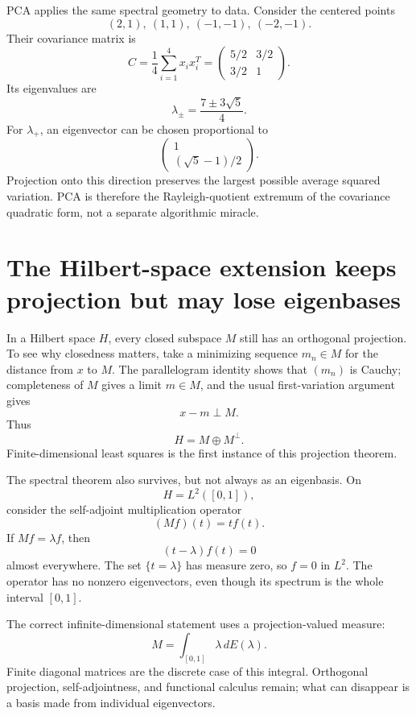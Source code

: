 PCA applies the same spectral geometry to data.  Consider the centered points
\[
  (2,1),\ (1,1),\ (-1,-1),\ (-2,-1).
\]
Their covariance matrix is
\[
  C=\frac14
  \sum_{i=1}^4x_ix_i^T
  =
  \begin{pmatrix}
    5/2&3/2\\
    3/2&1
  \end{pmatrix}.
\]
Its eigenvalues are
\[
  \lambda_{\pm}
  =\frac{7\pm3\sqrt5}{4}.
\]
For \(\lambda_+\), an eigenvector can be chosen proportional to
\[
  \begin{pmatrix}
    1\\(\sqrt5-1)/2
  \end{pmatrix}.
\]
Projection onto this direction preserves the largest possible average squared variation.  PCA is therefore the Rayleigh-quotient extremum of the covariance quadratic form, not a separate algorithmic miracle.

\section{The Hilbert-space extension keeps projection but may lose eigenbases}

In a Hilbert space \(H\), every closed subspace \(M\) still has an orthogonal projection.  To see why closedness matters, take a minimizing sequence \(m_n\in M\) for the distance from \(x\) to \(M\).  The parallelogram identity shows that \((m_n)\) is Cauchy; completeness of \(M\) gives a limit \(m\in M\), and the usual first-variation argument gives
\[
  x-m\perp M.
\]
Thus
\[
  H=M\oplus M^\perp.
\]
Finite-dimensional least squares is the first instance of this projection theorem.

The spectral theorem also survives, but not always as an eigenbasis.  On
\[
  H=L^2([0,1]),
\]
consider the self-adjoint multiplication operator
\[
  (Mf)(t)=t f(t).
\]
If \(Mf=\lambda f\), then
\[
  (t-\lambda)f(t)=0
\]
almost everywhere.  The set \(\{t=\lambda\}\) has measure zero, so \(f=0\) in \(L^2\).  The operator has no nonzero eigenvectors, even though its spectrum is the whole interval \([0,1]\).

The correct infinite-dimensional statement uses a projection-valued measure:
\[
  M=\int_{[0,1]}\lambda\,dE(\lambda).
\]
Finite diagonal matrices are the discrete case of this integral.  Orthogonal projection, self-adjointness, and functional calculus remain; what can disappear is a basis made from individual eigenvectors.